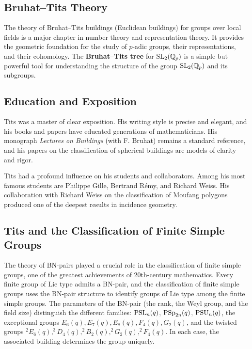 \subsection{Bruhat--Tits Theory}

The theory of Bruhat--Tits buildings (Euclidean buildings) for groups over local fields is a major chapter in number theory and representation theory. It provides the geometric foundation for the study of \(p\)-adic groups, their representations, and their cohomology. The \textbf{Bruhat--Tits tree} for \(\operatorname{SL}_2(\mathbb{Q}_p)\) is a simple but powerful tool for understanding the structure of the group \(\operatorname{SL}_2(\mathbb{Q}_p)\) and its subgroups.

\subsection{Education and Exposition}

Tits was a master of clear exposition. His writing style is precise and elegant, and his books and papers have educated generations of mathematicians. His monograph \textit{Lectures on Buildings} (with F. Bruhat) remains a standard reference, and his papers on the classification of spherical buildings are models of clarity and rigor.

Tits had a profound influence on his students and collaborators. Among his most famous students are Philippe Gille, Bertrand R\'emy, and Richard Weiss. His collaboration with Richard Weiss on the classification of Moufang polygons produced one of the deepest results in incidence geometry.

\subsection{Tits and the Classification of Finite Simple Groups}

The theory of BN-pairs played a crucial role in the classification of finite simple groups, one of the greatest achievements of 20th-century mathematics. Every finite group of Lie type admits a BN-pair, and the classification of finite simple groups uses the BN-pair structure to identify groups of Lie type among the finite simple groups. The parameters of the BN-pair (the rank, the Weyl group, and the field size) distinguish the different families: \(\operatorname{PSL}_n(q)\), \(\operatorname{PSp}_{2n}(q)\), \(\operatorname{PSU}_n(q)\), the exceptional groups \(E_6(q), E_7(q), E_8(q), F_4(q), G_2(q)\), and the twisted groups \(^2E_6(q), ^3D_4(q), ^2B_2(q), ^2G_2(q), ^2F_4(q)\). In each case, the associated building determines the group uniquely.

